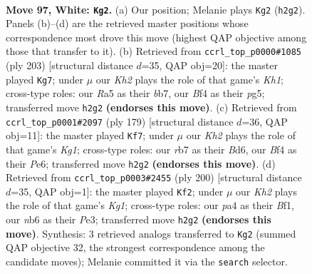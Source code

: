 \documentclass[11pt]{article}
\begin{document}
\clearpage

\begin{figure}[p]\centering
\begin{subfigure}{0.46\textwidth}\centering
\resizebox{\linewidth}{!}{%
\newchessgame
\chessboard[
  setfen={7k/1r6/1n3P1P/R7/p4B2/P7/7K/8 w - - 3 97},
  showmover=false,
  pgfstyle=straightmove, color=movearrow, markmove={h2-g2}
]}
\caption{}
\end{subfigure}\hfill
\begin{subfigure}{0.46\textwidth}\centering
\resizebox{\linewidth}{!}{%
\newchessgame
\chessboard[
  setfen={7k/1B6/p5p1/P1K1R1P1/8/8/8/3r1b2 b - - 59 102},
  showmover=false,
  pgfstyle=straightmove, color=movearrow, markmove={h8-g7}
]}
\caption{}
\end{subfigure}
\\[4pt]
\begin{subfigure}{0.46\textwidth}\centering
\resizebox{\linewidth}{!}{%
\newchessgame
\chessboard[
  setfen={6k1/8/3bp3/R7/1p6/pP4p1/P5K1/8 b - - 1 90},
  showmover=false,
  pgfstyle=straightmove, color=movearrow, markmove={g8-f7}
]}
\caption{}
\end{subfigure}\hfill
\begin{subfigure}{0.46\textwidth}\centering
\resizebox{\linewidth}{!}{%
\newchessgame
\chessboard[
  setfen={R7/6k1/6p1/8/6Pp/4Pn1P/8/3r1BK1 w - - 5 101},
  showmover=false,
  pgfstyle=straightmove, color=movearrow, markmove={g1-f2}
]}
\caption{}
\end{subfigure}
\caption{\textbf{Move 97, White: \texttt{Kg2}.} (a) Our position; Melanie plays \texttt{Kg2} (\texttt{h2g2}). Panels (b)--(d) are the retrieved master positions whose correspondence most drove this move (highest QAP objective among those that transfer to it). (b) Retrieved from \texttt{ccrl\_top\_p0000\#1085} (ply 203) [structural distance $d$=35, QAP obj=20]: the master played \texttt{Kg7}; under $\mu$ our \emph{Kh2} plays the role of that game's \emph{Kh1}; cross-type roles: our \emph{R}a5 as their \emph{b}b7, our \emph{B}f4 as their \emph{p}g5; transferred move \texttt{h2g2} \textbf{(endorses this move)}. (c) Retrieved from \texttt{ccrl\_top\_p0001\#2097} (ply 179) [structural distance $d$=36, QAP obj=11]: the master played \texttt{Kf7}; under $\mu$ our \emph{Kh2} plays the role of that game's \emph{Kg1}; cross-type roles: our \emph{r}b7 as their \emph{B}d6, our \emph{B}f4 as their \emph{P}e6; transferred move \texttt{h2g2} \textbf{(endorses this move)}. (d) Retrieved from \texttt{ccrl\_top\_p0003\#2455} (ply 200) [structural distance $d$=35, QAP obj=1]: the master played \texttt{Kf2}; under $\mu$ our \emph{Kh2} plays the role of that game's \emph{Kg1}; cross-type roles: our \emph{p}a4 as their \emph{B}f1, our \emph{n}b6 as their \emph{P}e3; transferred move \texttt{h2g2} \textbf{(endorses this move)}. Synthesis: 3 retrieved analogs transferred to \texttt{Kg2} (summed QAP objective 32, the strongest correspondence among the candidate moves); Melanie committed it via the \texttt{search} selector.}
\label{fig:thought-m192}
\end{figure}
\end{document}
